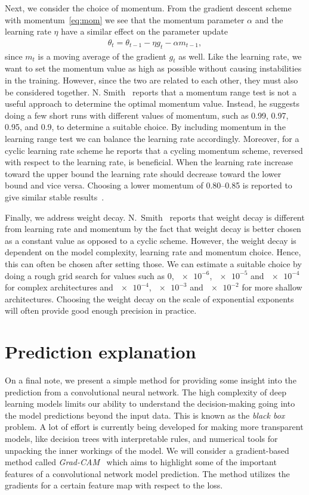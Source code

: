 Next, we consider the choice of momentum. From the gradient descent scheme with
momentum~\cref{eq:mom} we see that the momentum parameter $\alpha$ and the
learning rate $\eta$ have a similar effect on the parameter update
\begin{align*}
  \theta_t = \theta_{t-1} - \eta g_t - \alpha m_{t-1},
\end{align*}
since $m_t$ is a moving average of the gradient $g_t$ as well. Like the learning
rate, we want to set the momentum value as high as possible without causing
instabilities in the training. However, since the two are related to each other,
they must also be considered together. N. Smith~\cite{smith2018disciplined}
reports that a momentum range test is not a useful approach to determine the
optimal momentum value. Instead, he suggests doing a few short runs with different values of momentum,
such as 0.99, 0.97, 0.95, and 0.9, to determine a suitable choice. By including
momentum in the learning range test we can balance the learning rate accordingly. Moreover, for a cyclic learning rate scheme he reports that a cycling momentum scheme, reversed with respect to the learning rate, is beneficial. When the
learning rate increase toward the upper bound the learning rate should
decrease toward the lower bound and vice versa. Choosing a lower momentum of
0.80--0.85 is reported to give similar stable results~\cite{smith2018disciplined}. 

Finally, we address weight decay. N.\ Smith~\cite{smith2018disciplined} reports that weight decay is different from learning rate and momentum by the fact that weight decay is better chosen as a constant value as opposed to a cyclic scheme. However, the weight decay is dependent on the model complexity, learning rate and momentum choice. Hence, this can often be chosen after setting those. We can estimate a suitable choice by doing a rough grid search for values such as 0, $\num{e-6}$, $\num{e-5}$ and $\num{e-4}$ for complex architectures and $\num{e-4}$, $\num{e-3}$ and $\num{e-2}$ for more shallow architectures. Choosing the weight decay on the scale of exponential exponents will often provide good enough precision in practice. 


\section{Prediction explanation}\label{sec:explanation}
On a final note, we present a simple method for providing some insight into the prediction from a convolutional neural network. The high complexity of deep learning models limits our ability to understand the decision-making going into the model predictions beyond the input data. This is known as the \textit{black box} problem. A lot of effort is currently being developed for making more transparent models, like decision trees with interpretable rules, and numerical tools for unpacking the inner workings of the model. We will consider a gradient-based method called \textit{Grad-CAM}~\cite{Selvaraju_2019} which aims to highlight some of the important features of a convolutional network model prediction. The method utilizes the gradients for a certain feature map with respect to the loss. 


